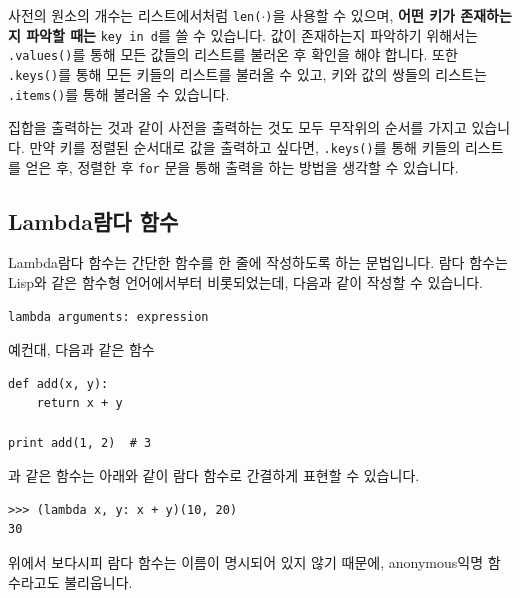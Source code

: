 \documentclass[../main.tex]{subfiles}
\begin{document}
사전의 원소의 개수는 리스트에서처럼 \texttt{len($\cdot$)}을 사용할 수 있으며, \textbf{어떤 키가 존재하는지 파악할 때는} \texttt{key in d}를 쓸 수 있습니다.
값이 존재하는지 파악하기 위해서는 \texttt{.values()}를 통해 모든 값들의 리스트를 불러온 후 확인을 해야 합니다.
또한 \texttt{.keys()}를 통해 모든 키들의 리스트를 불러올 수 있고, 키와 값의 쌍들의 리스트는 \texttt{.items()}를 통해 불러올 수 있습니다.

집합을 출력하는 것과 같이 사전을 출력하는 것도 모두 무작위의 순서를 가지고 있습니다.
만약 키를 정렬된 순서대로 값을 출력하고 싶다면, \texttt{.keys()}를 통해 키들의 리스트를 얻은 후, 정렬한 후 \texttt{for} 문을 통해 출력을 하는 방법을 생각할 수 있습니다.

\subsection{Lambda람다 함수}
Lambda람다 함수는 간단한 함수를 한 줄에 작성하도록 하는 문법입니다.
람다 함수는 Lisp와 같은 함수형 언어에서부터 비롯되었는데, 다음과 같이 작성할 수 있습니다.
\begin{verbatim}
lambda arguments: expression
\end{verbatim}
예컨대, 다음과 같은 함수
\begin{verbatim}
def add(x, y):
	return x + y

print add(1, 2)  # 3
\end{verbatim}
과 같은 함수는 아래와 같이 람다 함수로 간결하게 표현할 수 있습니다.
\begin{verbatim}
>>> (lambda x, y: x + y)(10, 20)
30
\end{verbatim}
위에서 보다시피 람다 함수는 이름이 명시되어 있지 않기 때문에, anonymous익명 함수라고도 불리웁니다.
\end{document}
